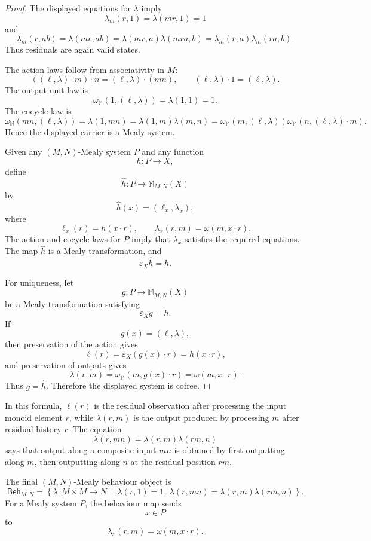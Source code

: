 \begin{proof}
The displayed equations for \(\lambda\) imply
\[
\lambda_m(r,1)=\lambda(mr,1)=1
\]
and
\[
\lambda_m(r,ab)
=
\lambda(mr,ab)
=
\lambda(mr,a)\lambda(mra,b)
=
\lambda_m(r,a)\lambda_m(ra,b).
\]
Thus residuals are again valid states.

The action laws follow from associativity in \(M\):
\[
((\ell,\lambda)\cdot m)\cdot n
=
(\ell,\lambda)\cdot(mn),
\qquad
(\ell,\lambda)\cdot1=(\ell,\lambda).
\]
The output unit law is
\[
\omega_{\mathbb M}(1,(\ell,\lambda))=\lambda(1,1)=1.
\]
The cocycle law is
\[
\omega_{\mathbb M}(mn,(\ell,\lambda))
=
\lambda(1,mn)
=
\lambda(1,m)\lambda(m,n)
=
\omega_{\mathbb M}(m,(\ell,\lambda))
\omega_{\mathbb M}(n,(\ell,\lambda)\cdot m).
\]
Hence the displayed carrier is a Mealy system.

Given any \((M,N)\)-Mealy system \(P\) and any function
\[
h:P\to X,
\]
define
\[
\widehat h:P\to\mathbb M_{M,N}(X)
\]
by
\[
\widehat h(x)=(\ell_x,\lambda_x),
\]
where
\[
\ell_x(r)=h(x\cdot r),
\qquad
\lambda_x(r,m)=\omega(m,x\cdot r).
\]
The action and cocycle laws for \(P\) imply that \(\lambda_x\) satisfies the
required equations. The map \(\widehat h\) is a Mealy transformation, and
\[
\varepsilon_X\widehat h=h.
\]

For uniqueness, let
\[
g:P\to\mathbb M_{M,N}(X)
\]
be a Mealy transformation satisfying
\[
\varepsilon_Xg=h.
\]
If
\[
g(x)=(\ell,\lambda),
\]
then preservation of the action gives
\[
\ell(r)
=
\varepsilon_X(g(x)\cdot r)
=
h(x\cdot r),
\]
and preservation of outputs gives
\[
\lambda(r,m)
=
\omega_{\mathbb M}(m,g(x)\cdot r)
=
\omega(m,x\cdot r).
\]
Thus \(g=\widehat h\). Therefore the displayed system is cofree.
\end{proof}

\begin{remark}
\label{rem:monoid-cofree-interpretation}
In this formula, \(\ell(r)\) is the residual observation after processing the
input monoid element \(r\), while \(\lambda(r,m)\) is the output produced by
processing \(m\) after residual history \(r\). The equation
\[
\lambda(r,mn)=\lambda(r,m)\lambda(rm,n)
\]
says that output along a composite input \(mn\) is obtained by first outputting
along \(m\), then outputting along \(n\) at the residual position \(rm\).
\end{remark}

\begin{corollary}
\label{cor:final-monoid-behaviour}
The final \((M,N)\)-Mealy behaviour object is
\[
\mathsf{Beh}_{M,N}
=
\left\{
\lambda:M\times M\to N
\ \middle|\
\lambda(r,1)=1,\
\lambda(r,mn)=\lambda(r,m)\lambda(rm,n)
\right\}.
\]
For a Mealy system \(P\), the behaviour map sends
\[
x\in P
\]
to
\[
\lambda_x(r,m)=\omega(m,x\cdot r).
\]
\end{corollary}

